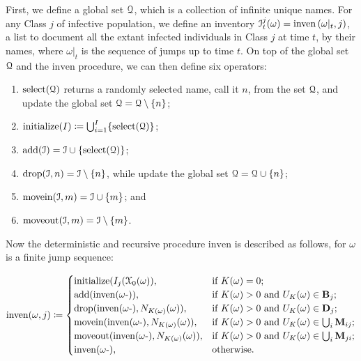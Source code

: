 \documentclass[11pt,reqno,final]{amsart}\usepackage[]{graphicx}\usepackage[]{color}
\begin{document}
First, we define a global set $\mathcal{Q}$, which is a collection of infinite unique names. For any Class $j$ of infective population, we define an inventory $\mathcal{I}_t^j(\omega)=\mathrm{inven}\left(\omega\vert_t,j\right)$, a list to document all the extant infected individuals in Class $j$ at time $t$, by their names, where $\omega\vert_t$ is the sequence of jumps up to time $t$. On top of the global set $\mathcal{Q}$ and the $\mathrm{inven}$ procedure, we can then define six operators: 
\begin{enumerate}[(1)]
  \item $\mathrm{select}(\mathcal{Q})$ returns a randomly selected name, call it $n$, from the set $\mathcal{Q}$, and update the global set $\mathcal{Q}=\mathcal{Q}\setminus\{n\}$;
  \item $\mathrm{initialize}(I)\coloneqq\bigcup_{i=1}^I\{\mathrm{select}(\mathcal{Q})\}$;
  \item $\mathrm{add}(\mathcal{I})=\mathcal{I}\cup\{\mathrm{select}(\mathcal{Q})\}$;
  \item $\mathrm{drop}(\mathcal{I},n)=\mathcal{I}\setminus\{n\}$, while update the global set $\mathcal{Q}=\mathcal{Q}\cup\{n\}$;
  \item $\mathrm{movein}(\mathcal{I},m)=\mathcal{I}\cup\{m\}$; and
  \item $\mathrm{moveout}(\mathcal{I},m)=\mathcal{I}\setminus\{m\}$.
\end{enumerate}


Now the deterministic and recursive procedure $\mathrm{inven}$ is described as follows, for $\omega$ is a finite jump sequence:

\begin{equation}
  \mathrm{inven}(\omega,j)\coloneqq
  \begin{cases}
    \mathrm{initialize}(I_j(\mathcal{X}_0(\omega)), & \text{if }K(\omega)=0; \\
    \mathrm{add}(\mathrm{inven}({\omega}\mbox{-})), & \text{if }K(\omega)>0\text{ and }U_K(\omega)\in\mathbf{B}_j;\\
    \mathrm{drop}(\mathrm{inven}({\omega}\mbox{-}),N_{K(\omega)}(\omega)), & \text{if }K(\omega)>0\text{ and }U_K(\omega)\in\mathbf{D}_j; \\
    \mathrm{movein}(\mathrm{inven}({\omega}\mbox{-}),N_{K(\omega)}(\omega)), & \text{if }K(\omega)>0\text{ and }U_K(\omega)\in\bigcup_i\mathbf{M}_{ij}; \\
    \mathrm{moveout}(\mathrm{inven}({\omega}\mbox{-}),N_{K(\omega)}(\omega)), & \text{if }K(\omega)>0\text{ and }U_K(\omega)\in\bigcup_i\mathbf{M}_{ji}; \\
    \mathrm{inven}({\omega}\mbox{-}), & \text{otherwise}.
  \end{cases}
\end{equation}
\end{document}
